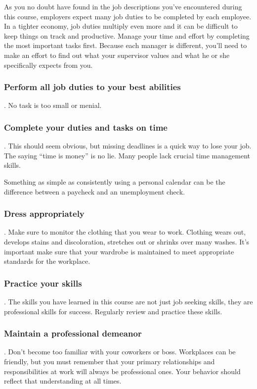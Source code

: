 As you no doubt have found in the job descriptions you've encountered during this course, employers expect many job duties to be completed by each employee. In a tighter economy, job duties multiply even more and it can be difficult to keep things on track and productive. Manage your time and effort by completing the most important tasks first. Because each manager is different, you'll need to make an effort to find out what your supervisor values and what he or she specifically expects from you.

\subsubsection*{Perform all job duties to your best abilities}. No task is too small or menial.

\subsubsection*{Complete your duties and tasks on time}. This should seem obvious, but missing deadlines is a quick way to lose your job. The saying ``time is money'' is no lie. Many people lack crucial time management skills.

Something as simple as consistently using a personal calendar can be the difference between a paycheck and an unemployment check.

\subsubsection*{Dress appropriately}. Make sure to monitor the clothing that you wear to work. Clothing wears out, develops stains and discoloration, stretches out or shrinks over many washes. It's important make sure that your wardrobe is maintained to meet appropriate standards for the workplace.

\subsubsection*{Practice your skills}. The skills you have learned in this course are not just job seeking skills, they are professional skills for success. Regularly review and practice these skills.

\subsubsection*{Maintain a professional demeanor}. Don't become too familiar with your coworkers or boss. Workplaces can be friendly, but you must remember that your primary relationships and responsibilities at work will always be professional ones. Your behavior should reflect that understanding at all times.

